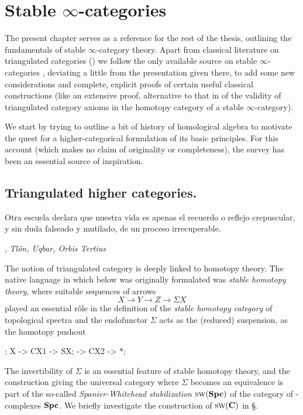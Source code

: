 \chapter{Stable $\infty$\hyp{}categories}\label{chap:stable.cats}
\thispagestyle{empty}
The present chapter serves as a reference for the rest of the thesis, outlining the fundamentals of stable $\infty$\hyp{}category theory. Apart from classical literature on triangulated categories (\cite{Hol,Nee}) we follow the only available source on stable $\infty$\hyp{}categories \cite{LurieHA}, deviating a little from the presentation given there, to add some new considerations and complete, explicit proofs of certain useful classical constructions (like an extensive proof, alternative to that in \cite{LurieHA} of the validity of triangulated category axioms in the homotopy category of a stable $\infty$\hyp{}category). 

We start by trying to outline a bit of history of homological algebra to motivate the quest for a higher\hyp{}categorical formulation of its basic principles. For this account (which makes no claim of originality or completeness), the survey \cite{Weibel1997history} has been an essential source of inspiration.
\section{Triangulated higher categories.}
\setlength{\epigraphwidth}{.7\textwidth}
\epigraph{Otra escuela declara \omissis que nuestra vida es apenas el recuerdo o reflejo crepuscular, y sin duda falseado y mutilado, de un proceso irrecuperable.}{\cite{Borges1963}, \emph{Tl\"on, Uqbar, Orbis Tertius}}
\setlength{\epigraphwidth}{\DefaultEpigraphWidth}
The notion of triangulated category is deeply linked to homotopy theory. The native language in which \adef {} below was originally formulated was \emph{stable homotopy theory}, where suitable sequences of arrows
\[\label{dt}
X \to Y\to Z\to \Sigma X
\]
played an essential r\^ole in the definition of the \emph{stable homotopy category} of topological spectra and the endofunctor $\Sigma$ acts as the (reduced) suspension, \ie as the homotopy pushout
\begin{center}
\label{redsusp}
\begin{kD}
;
\mor X -> CX1 -> SX;
\mor * -> CX2 -> *;
\end{kD}
\end{center}
The invertibility of $\Sigma$ is an essential feature of stable homotopy theory, and the construction giving the universal category where $\Sigma$ becomes an equivalence is part of the so\hyp{}called \emph{Spanier\hyp{}Whitehead stabilization} $\text{\scshape sw}(\textbf{Spc})$ of the category of \hyp{}complexes $\textbf{Spc}$. We briefly investigate the construction of $\text{\scshape sw}(\textbf{C})$ in \S{}.

